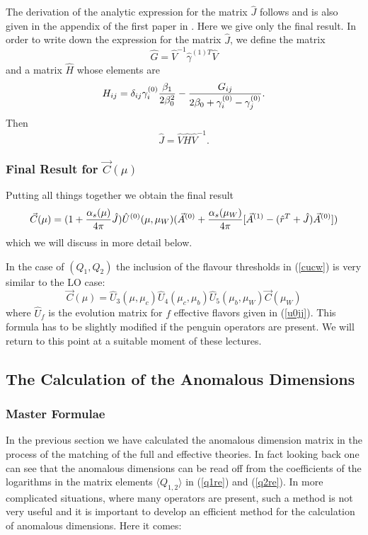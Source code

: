 \documentclass[12pt,rotate]{article}
\def\as{\alpha_s}
\begin{document}
\begin{itemize}
\begin{itemize}
\begin{itemize}
The derivation of the analytic expression for the matrix $\hat J$ follows
\cite{AB80} and is also given in the appendix of the first paper in
\cite{BJLW1}. Here we give
only the final result.
In order to write down the expression for the matrix $\hat J$,
 we define the matrix
\begin{equation}\label{gvg1} 
\hat G=\hat V^{-1} {\hat\gamma^{(1)T}} \hat V   \end{equation}
and a matrix $\hat H$ whose elements are
\begin{equation}\label{sij} 
H_{ij}=\delta_{ij}\gamma^{(0)}_i{\beta_1\over 2\beta^2_0}-
    {G_{ij}\over 2\beta_0+\gamma^{(0)}_i-\gamma^{(0)}_j}.  \end{equation}
Then
\begin{equation}\label{jvs} \hat J=\hat V \hat H \hat V^{-1}.
 \end{equation}

\subsubsection{Final Result for $\vec C(\mu)$}
Putting all things together we obtain the final result
\begin{equation}\label{cjua} 
\vec C(\mu)=(1+{\as(\mu)\over 4\pi} \hat J)\hat U^{(0)}(\mu,\mu_W)
(\vec A^{(0)}+{\as(\mu_W)\over 4\pi}[\vec A^{(1)}
-(\hat r^T+\hat J)\vec A^{(0)}])\end{equation}
which we will discuss in more detail below.

In the case of $(Q_1,Q_2)$ the inclusion of the flavour thresholds in 
(\ref{cucw}) is very similar to the  LO case:
\begin{equation}\label{cthrP}
\vec C(\mu)=\hat U_3(\mu,\mu_c)\hat U_4(\mu_c,\mu_b)
\hat U_5(\mu_b,\mu_W)\vec C(\mu_W)  \end{equation}
where $\hat U_f$ is the evolution matrix for $f$ effective flavors
given in (\ref{u0jj}). This formula has to be slightly modified
if the penguin operators are present. We will return to this point
at a suitable moment of these lectures.

\subsection{The Calculation of the Anomalous Dimensions}
               \label{sec:basicform:wc:adm}
\subsubsection{Master Formulae}
In the previous section we have calculated the anomalous dimension
matrix in the process of the matching of the full and effective
theories. In fact looking back one can see that the anomalous dimensions
can be read off from the coefficients of the logarithms in the matrix
elements $\langle Q_{1,2}\rangle$ in (\ref{q1re}) and (\ref{q2re}).
In more complicated situations, where many operators are present,
such a method is not very useful and it is important
to develop an efficient method for the calculation of 
anomalous dimensions. Here it comes:


\end{itemize}
\end{itemize}
\end{itemize}
\end{document}
